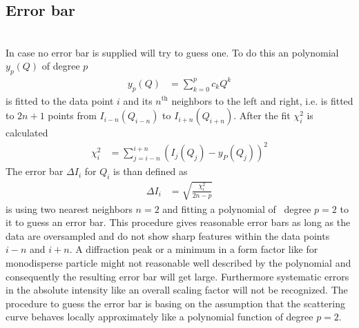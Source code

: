 \subsection{Error bar} \hspace{1pt}\\

\noindent
In case no error bar is supplied \SASfit will try to guess one.
To do this an polynomial $y_p(Q)$ of degree $p$
\begin{align}
y_p(Q) &= \sum_{k=0}^p c_k Q^k
\end{align}
is fitted to the data point $i$ and its $n^\textrm{th}$ neighbors to the left and right,
i.e. is fitted to $2n+1$ points from $I_{i-n}(Q_{i-n})$ to $I_{i+n}(Q_{i+n})$.
After the fit $\chi_i^2$ is calculated
\begin{align}
\chi_i^2&=\sum_{j=i-n}^{i+n} \left(I_j(Q_j)-y_P(Q_j)\right)^2
\end{align}
The error bar $\Delta I_i$ for $Q_i$ is than defined as
\begin{align}
\Delta I_i &= \sqrt{\frac{\chi_i^2}{2n-p}}
\end{align}
\SASfit is using two nearest neighbors $n=2$ and fitting a polynomial of \
degree $p=2$ to it to guess an error bar.
This procedure gives reasonable error bars as long as the data are oversampled and do not show sharp features within the data points $i-n$ and $i+n$. A diffraction peak or a minimum in a form factor like for monodisperse particle might not reasonable well described by the polynomial and consequently the resulting error bar will get large. Furthermore systematic errors in the absolute intensity like an overall scaling factor will not be recognized. The procedure to guess the error bar is basing on the assumption that the scattering curve behaves locally approximately like a polynomial function of degree $p=2$.

